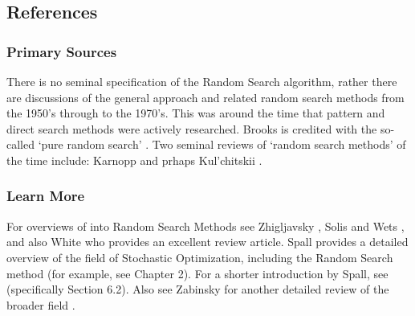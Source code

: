 

\subsection{References}

% 
% 
\subsubsection{Primary Sources}
There is no seminal specification of the Random Search algorithm, rather there are discussions of the general approach and related random search methods from the 1950's through to the 1970's. This was around the time that pattern and direct search methods were actively researched.
Brooks is credited with the so-called `pure random search' \cite{Brooks1958}. Two seminal reviews of `random search methods' of the time include: Karnopp \cite{Karnopp1963} and prhaps Kul'chitskii \cite{Kul'chitskii1976}.

% 
% 
\subsubsection{Learn More}
For overviews of into Random Search Methods see Zhigljavsky \cite{Zhigljavsky1991}, Solis and Wets \cite{Solis1981}, and also White \cite{White1971} who provides an excellent review article.
Spall provides a detailed overview of the field of Stochastic Optimization, including the Random Search method \cite{Spall2003} (for example, see Chapter 2). For a shorter introduction by Spall, see \cite{Spall2004} (specifically Section 6.2). Also see Zabinsky for another detailed review of the broader field \cite{Zabinsky2003}.


